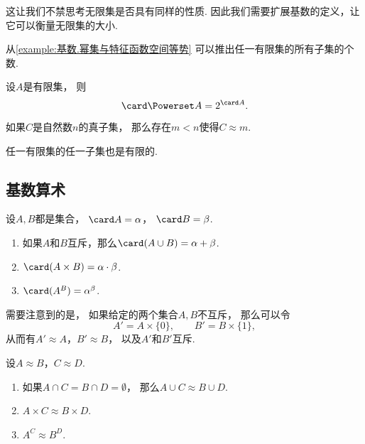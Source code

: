 这让我们不禁思考无限集是否具有同样的性质.
因此我们需要扩展基数的定义，让它可以衡量无限集的大小.

从\cref{example:基数.幂集与特征函数空间等势} 可以推出任一有限集的所有子集的个数.
\begin{theorem}
设\(A\)是有限集，
则\begin{equation}
	\card \Powerset A
	= 2^{\card A}.
\end{equation}
\end{theorem}

\begin{lemma}
如果\(C\)是自然数\(n\)的真子集，
那么存在\(m<n\)使得\(C \approx m\).
\end{lemma}

\begin{theorem}
任一有限集的任一子集也是有限的.
\end{theorem}

\subsection{基数算术}
\begin{definition}
设\(A,B\)都是集合，
\(\card A = \alpha\)，
\(\card B = \beta\).
\begin{enumerate}
	\item 如果\(A\)和\(B\)互斥，那么\(\card(A \cup B)=\alpha+\beta\).
	\item \(\card(A \times B)=\alpha\cdot\beta\).
	\item \(\card(A^B)=\alpha^\beta\).
\end{enumerate}
\end{definition}

需要注意到的是，
如果给定的两个集合\(A,B\)不互斥，
那么可以令\[
	A' = A\times\{0\}, \qquad
	B' = B\times\{1\},
\]
从而有\(A' \approx A\)，\(B' \approx B\)，
以及\(A'\)和\(B'\)互斥.

\begin{theorem}
设\(A \approx B\)，\(C \approx D\).
\begin{enumerate}
	\item 如果\(A \cap C = B \cap D = \emptyset\)，
	那么\(A \cup C \approx B \cup D\).
	\item \(A \times C \approx B \times D\).
	\item \(A^C \approx B^D\).
\end{enumerate}
\end{theorem}

